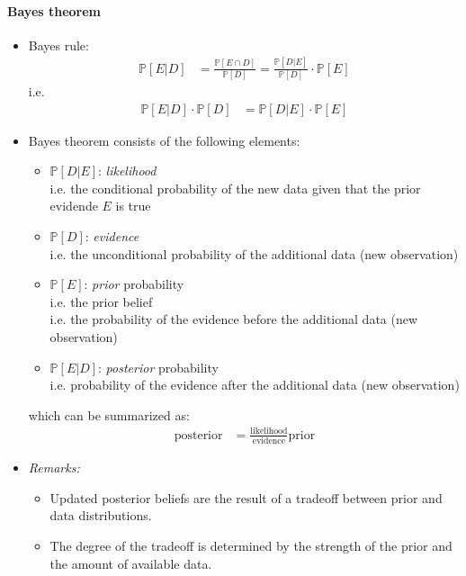 \documentclass[a4paper,landscape,8pt,fleqn]{scrartcl}
\begin{document}
\begin{multicols*}{3}
\paragraph{Bayes theorem}
\begin{itemize}
\item Bayes rule:
\begin{align*}
\mathbb{P}[E | D] &= \frac{\mathbb{P}[E \cap D]}{\mathbb{P}[D]} = \frac{\mathbb{P}[D | E]}{\mathbb{P}[D]} \cdot \mathbb{P}[E]
\end{align*}
i.e.
\begin{align*}
\mathbb{P}[E | D] \cdot \mathbb{P}[D] &= \mathbb{P}[D | E] \cdot \mathbb{P}[E]
\end{align*}
\item Bayes theorem consists of the following elements:
\begin{itemize}
\item $\mathbb{P}[D | E]$: \textit{likelihood} \\
i.e. the conditional probability of the new data given that the prior evidende $E$ is true
\item $\mathbb{P}[D]$: \textit{evidence} \\
i.e. the unconditional probability of the additional data (new observation)
\item $\mathbb{P}[E]$: \textit{prior} probability \\
i.e. the prior belief \\
i.e. the probability of the evidence before the additional data (new observation)
\item $\mathbb{P}[E | D]$: \textit{posterior} probability \\
i.e. probability of the evidence after the additional data (new observation)
\end{itemize}
which can be summarized as:
\begin{align*}
\text{posterior} &= \frac{\text{likelihood}}{\text{evidence}} \text{prior}
\end{align*}
\item \textit{Remarks:}
\begin{itemize}
\item Updated posterior beliefs are the result of a tradeoff between prior and data distributions.
\item The degree of the tradeoff is determined by the strength of the prior and the amount of available data.
\end{itemize}
\end{itemize}


\end{multicols*}
\end{document}
